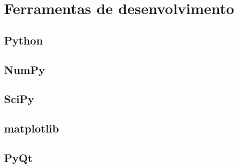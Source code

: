 \section{Ferramentas de desenvolvimento}
\subsection{Python}
\subsection{NumPy}
\subsection{SciPy}
\subsection{matplotlib}
\subsection{PyQt}

